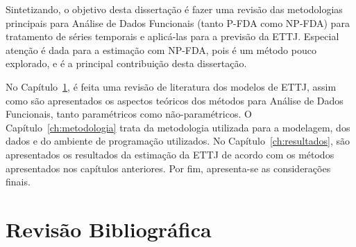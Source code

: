 \documentclass[
	12pt,				%
	openright,			%
	oneside,			%
	a4paper,			%
	english,			%
	brazil				%
	]{dissertacao-ufrgs-abntex2}
\begin{document}
Sintetizando, o objetivo desta dissertação é fazer uma revisão das metodologias
principais para Análise de Dados Funcionais (tanto P-FDA como NP-FDA)
para tratamento de séries temporais e aplicá-las para a previsão da ETTJ. Especial atenção é dada para a estimação com NP-FDA, pois é um método pouco explorado, e é a principal contribuição desta dissertação.

No Capítulo~\ref{ch:revisao-biblio}, é feita uma revisão de literatura dos modelos de ETTJ, assim como são apresentados os aspectos teóricos dos métodos para Análise de Dados Funcionais, tanto paramétricos como não-paramétricos. 
O Capítulo~\ref{ch:metodologia} trata
da metodologia utilizada para a modelagem, dos dados e do ambiente
de programação utilizados. No Capítulo~\ref{ch:resultados},
são apresentados os resultados da estimação da ETTJ de acordo com os métodos apresentados
nos capítulos anteriores. Por fim, apresenta-se as considerações finais.


%
%
%


\chapter{Revisão Bibliográfica} \label{ch:revisao-biblio}
\end{document}
